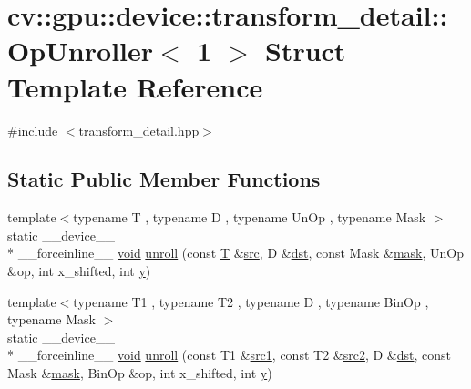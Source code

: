 \hypertarget{structcv_1_1gpu_1_1device_1_1transform__detail_1_1OpUnroller_3_011_01_4}{\section{cv\-:\-:gpu\-:\-:device\-:\-:transform\-\_\-detail\-:\-:Op\-Unroller$<$ 1 $>$ Struct Template Reference}
\label{structcv_1_1gpu_1_1device_1_1transform__detail_1_1OpUnroller_3_011_01_4}
}


{\ttfamily \#include $<$transform\-\_\-detail.\-hpp$>$}

\subsection*{Static Public Member Functions}
\begin{DoxyCompactItemize}
\item 
{\footnotesize template$<$typename T , typename D , typename Un\-Op , typename Mask $>$ }\\static \-\_\-\-\_\-device\-\_\-\-\_\- \\*
\-\_\-\-\_\-forceinline\-\_\-\-\_\- \hyperlink{legacy_8hpp_a8bb47f092d473522721002c86c13b94e}{void} \hyperlink{structcv_1_1gpu_1_1device_1_1transform__detail_1_1OpUnroller_3_011_01_4_a1637cbf922d1e320ffe2b307fe26b79f}{unroll} (const \hyperlink{calib3d_8hpp_a3efb9551a871ddd0463079a808916717}{T} \&\hyperlink{legacy_8hpp_a371cd109b74033bc4366f584edd3dacc}{src}, D \&\hyperlink{photo__c_8h_aed13e2a25279b24dc954073233fef7a5}{dst}, const Mask \&\hyperlink{tracking_8hpp_a6b13ecd2fd6ec7ad422f1d7863c3ad19}{mask}, Un\-Op \&op, int x\-\_\-shifted, int \hyperlink{highgui__c_8h_af1202c02b14870c18fb3a1da73e9e7c7}{y})
\item 
{\footnotesize template$<$typename T1 , typename T2 , typename D , typename Bin\-Op , typename Mask $>$ }\\static \-\_\-\-\_\-device\-\_\-\-\_\- \\*
\-\_\-\-\_\-forceinline\-\_\-\-\_\- \hyperlink{legacy_8hpp_a8bb47f092d473522721002c86c13b94e}{void} \hyperlink{structcv_1_1gpu_1_1device_1_1transform__detail_1_1OpUnroller_3_011_01_4_ae1451a0aeb2ae5f1d9e31adf7aed9188}{unroll} (const T1 \&\hyperlink{core__c_8h_a897de4702c922f4cccda0d57ccdcafb3}{src1}, const T2 \&\hyperlink{core__c_8h_a7561a36d48069d54a6c8ac4e4750edfd}{src2}, D \&\hyperlink{photo__c_8h_aed13e2a25279b24dc954073233fef7a5}{dst}, const Mask \&\hyperlink{tracking_8hpp_a6b13ecd2fd6ec7ad422f1d7863c3ad19}{mask}, Bin\-Op \&op, int x\-\_\-shifted, int \hyperlink{highgui__c_8h_af1202c02b14870c18fb3a1da73e9e7c7}{y})
\end{DoxyCompactItemize}


